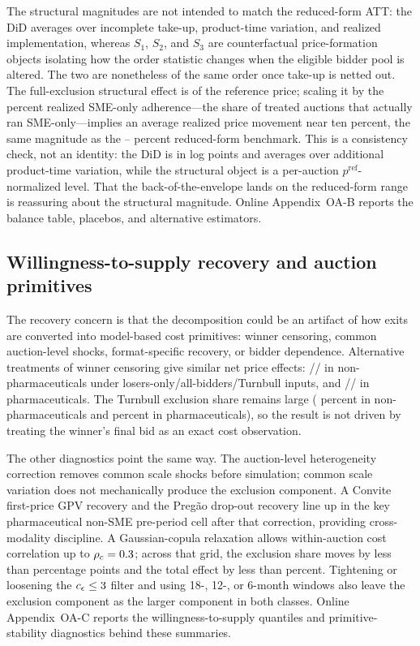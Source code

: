 The structural magnitudes are not intended to match the reduced-form ATT:
the DiD averages over incomplete take-up, product-time variation, and
realized implementation, whereas $S_1$, $S_2$, and $S_3$ are counterfactual
price-formation objects isolating how the order statistic changes when the
eligible bidder pool is altered. The two are nonetheless of the same order
once take-up is netted out. The full-exclusion structural effect is
\bneEffectTotalNp{} of the reference price; scaling it by the
\adherenceGsixtyfivePost{} percent realized SME-only adherence---the share
of treated auctions that actually ran SME-only---implies an average realized
price movement near ten percent, the same magnitude as the
\didLowerPct--\didUpperPct{} percent reduced-form benchmark. This is a
consistency check, not an identity: the DiD is in log points and averages
over additional product-time variation, while the structural object is a
per-auction $p^{\mathrm{ref}}$-normalized level. That the back-of-the-envelope
lands on the reduced-form range is reassuring about the structural magnitude.
Online Appendix~OA-B reports the balance table, placebos, and alternative
estimators.

\subsection{Willingness-to-supply recovery and auction primitives}

The recovery concern is that the decomposition could be an artifact of how
exits are converted into model-based cost primitives: winner censoring,
common auction-level shocks, format-specific recovery, or bidder dependence.
Alternative treatments of winner censoring give similar net price effects:
\costRegimeLosersNp/\costRegimeAllNp/\costRegimeTurnNp{} in
non-pharmaceuticals under losers-only/all-bidders/Turnbull inputs, and
\costRegimeLosersPh/\costRegimeAllPh/\costRegimeTurnPh{} in pharmaceuticals.
The Turnbull exclusion share remains large (\turnbullShareNp{} percent in
non-pharmaceuticals and \turnbullSharePh{} percent in pharmaceuticals), so
the result is not driven by treating the winner's final bid as an exact cost
observation.

The other diagnostics point the same way. The auction-level heterogeneity
correction removes common scale shocks before simulation; common scale
variation does not mechanically produce the exclusion component. A Convite
first-price GPV recovery and the Preg\~ao drop-out recovery line up in the
key pharmaceutical non-SME pre-period cell after that correction, providing
cross-modality discipline. A Gaussian-copula relaxation allows within-auction
cost correlation up to $\rho_c=0.3$; across that grid, the exclusion
share moves by less than \ipvShareDriftPp{} percentage points and the total
effect by less than \ipvTotalDriftPct{} percent. Tightening or loosening the
$c_\epsilon\le3$ filter and using 18-, 12-, or 6-month windows
also leave the exclusion component as the larger component in both classes.
Online Appendix~OA-C reports the willingness-to-supply quantiles and
primitive-stability diagnostics behind these summaries.

